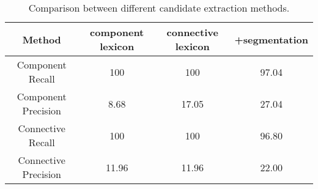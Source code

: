 \begin{table}[ht]
\centering
\begin{tabular}{|c|c|c|c|}
\hline
Method                  & component lexicon & connective lexicon & +segmentation \\ \hline

Component Recall        & 100               & 100                & 97.04         \\ \hline
Component Precision     & 8.68              & 17.05              & 27.04         \\

\hhline{|=|=|=|=|}

Connective Recall       & 100               & 100                & 96.80         \\ \hline
Connective Precision    & 11.96             & 11.96              & 22.00         \\ \hline

\end{tabular}
\caption{\label{t:cand-extract} Comparison between different candidate extraction methods.}
\end{table}
